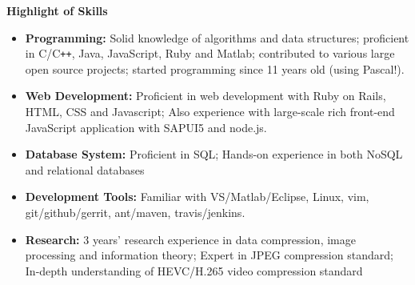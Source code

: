 \documentclass[letterpaper,10pt]{article}
\newcommand{\resheading}[1]{{\large \colorbox{mygrey}{\begin{minipage}{\textwidth}{\textbf{#1 \vphantom{p\^{E}}}}\end{minipage}}}}
\begin{document}
\resheading{Highlight of Skills}
\begin{itemize}
\itemsep0em
\item {\textbf {Programming:}} Solid knowledge of algorithms and data structures; proficient in C/C{}\verb!++!, Java, JavaScript, Ruby and Matlab; contributed to various large open source projects; started programming since 11 years old (using Pascal!).
\item{\textbf {Web Development:}} Proficient in web development with Ruby on Rails, HTML, CSS and Javascript; Also experience with large-scale rich front-end JavaScript application with SAPUI5 and node.js.
\item{\textbf {Database System:}} Proficient in SQL; Hands-on experience in both NoSQL and relational databases
\item{\textbf {Development Tools:}} Familiar with VS/Matlab/Eclipse, Linux, vim, git/github/gerrit, ant/maven, travis/jenkins.
\item{\textbf {Research:}} 3 years' research experience in data compression, image processing and information theory; Expert in JPEG compression standard; In-depth understanding of HEVC/H.265 video compression standard

\end{itemize}
\end{document}
